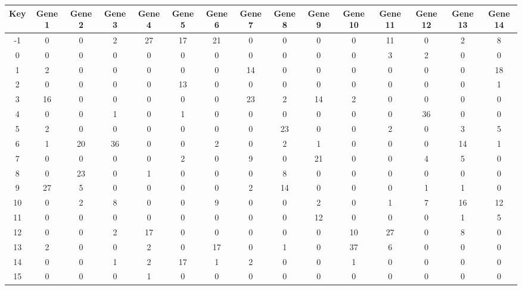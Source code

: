 \begin{tabular}{|c|c|c|c|c|c|c|c|c|c|c|c|c|c|c|}
\hline
Key & Gene 1 & Gene 2 & Gene 3 & Gene 4 & Gene 5 & Gene 6 & Gene 7 & Gene 8 & Gene 9 & Gene 10 & Gene 11 & Gene 12 & Gene 13 & Gene 14 \\
\hline
-1 & 0 & 0 & 2 & 27 & 17 & 21 & 0 & 0 & 0 & 0 & 11 & 0 & 2 & 8 \\
0 & 0 & 0 & 0 & 0 & 0 & 0 & 0 & 0 & 0 & 0 & 3 & 2 & 0 & 0 \\
1 & 2 & 0 & 0 & 0 & 0 & 0 & 14 & 0 & 0 & 0 & 0 & 0 & 0 & 18 \\
2 & 0 & 0 & 0 & 0 & 13 & 0 & 0 & 0 & 0 & 0 & 0 & 0 & 0 & 1 \\
3 & 16 & 0 & 0 & 0 & 0 & 0 & 23 & 2 & 14 & 2 & 0 & 0 & 0 & 0 \\
4 & 0 & 0 & 1 & 0 & 1 & 0 & 0 & 0 & 0 & 0 & 0 & 36 & 0 & 0 \\
5 & 2 & 0 & 0 & 0 & 0 & 0 & 0 & 23 & 0 & 0 & 2 & 0 & 3 & 5 \\
6 & 1 & 20 & 36 & 0 & 0 & 2 & 0 & 2 & 1 & 0 & 0 & 0 & 14 & 1 \\
7 & 0 & 0 & 0 & 0 & 2 & 0 & 9 & 0 & 21 & 0 & 0 & 4 & 5 & 0 \\
8 & 0 & 23 & 0 & 1 & 0 & 0 & 0 & 8 & 0 & 0 & 0 & 0 & 0 & 0 \\
9 & 27 & 5 & 0 & 0 & 0 & 0 & 2 & 14 & 0 & 0 & 0 & 1 & 1 & 0 \\
10 & 0 & 2 & 8 & 0 & 0 & 9 & 0 & 0 & 2 & 0 & 1 & 7 & 16 & 12 \\
11 & 0 & 0 & 0 & 0 & 0 & 0 & 0 & 0 & 12 & 0 & 0 & 0 & 1 & 5 \\
12 & 0 & 0 & 2 & 17 & 0 & 0 & 0 & 0 & 0 & 10 & 27 & 0 & 8 & 0 \\
13 & 2 & 0 & 0 & 2 & 0 & 17 & 0 & 1 & 0 & 37 & 6 & 0 & 0 & 0 \\
14 & 0 & 0 & 1 & 2 & 17 & 1 & 2 & 0 & 0 & 1 & 0 & 0 & 0 & 0 \\
15 & 0 & 0 & 0 & 1 & 0 & 0 & 0 & 0 & 0 & 0 & 0 & 0 & 0 & 0 \\
\hline
\end{tabular}
